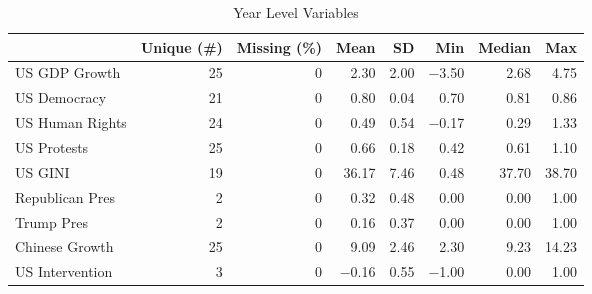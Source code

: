\begin{table}

\caption{Year Level Variables}
\centering
\begin{tabular}[t]{lrrrrrrr}
\toprule
  & Unique (\#) & Missing (\%) & Mean & SD & Min & Median & Max\\
\midrule
US GDP Growth & 25 & 0 & \num{2.30} & \num{2.00} & \num{-3.50} & \num{2.68} & \num{4.75}\\
US Democracy & 21 & 0 & \num{0.80} & \num{0.04} & \num{0.70} & \num{0.81} & \num{0.86}\\
US Human Rights & 24 & 0 & \num{0.49} & \num{0.54} & \num{-0.17} & \num{0.29} & \num{1.33}\\
US Protests & 25 & 0 & \num{0.66} & \num{0.18} & \num{0.42} & \num{0.61} & \num{1.10}\\
US GINI & 19 & 0 & \num{36.17} & \num{7.46} & \num{0.48} & \num{37.70} & \num{38.70}\\
Republican Pres & 2 & 0 & \num{0.32} & \num{0.48} & \num{0.00} & \num{0.00} & \num{1.00}\\
Trump Pres & 2 & 0 & \num{0.16} & \num{0.37} & \num{0.00} & \num{0.00} & \num{1.00}\\
Chinese Growth & 25 & 0 & \num{9.09} & \num{2.46} & \num{2.30} & \num{9.23} & \num{14.23}\\
US Intervention & 3 & 0 & \num{-0.16} & \num{0.55} & \num{-1.00} & \num{0.00} & \num{1.00}\\
\bottomrule
\end{tabular}
\end{table}
